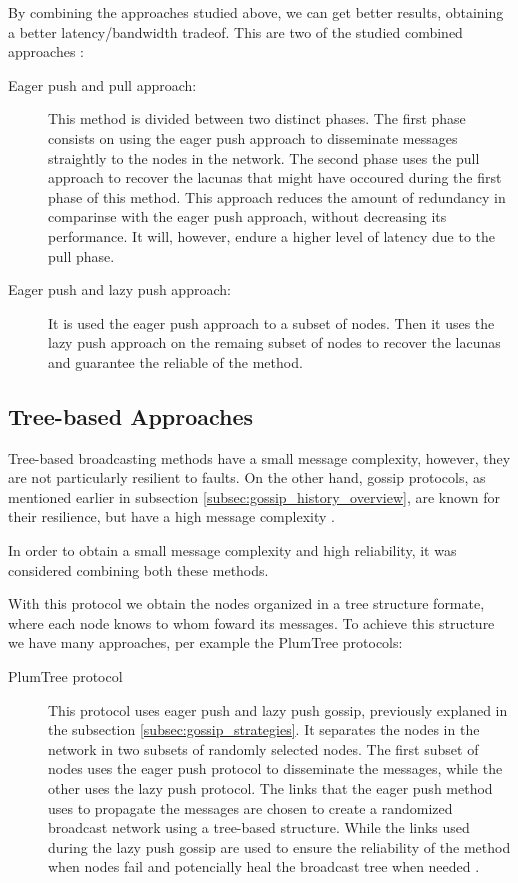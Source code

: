 By combining the approaches studied above, we can get better results, obtaining a better
latency/bandwidth tradeof. This are two of the studied combined approaches \cite{Carvalho2007}:
\begin{description}
    \item[Eager push and pull approach:] This method is divided between two distinct phases.
        The first phase consists on using the eager push approach to disseminate messages
        straightly to the nodes in the network. The second phase uses the pull approach to
        recover the lacunas that might have occoured during the first phase of this method.
        This approach reduces the amount of redundancy in comparinse with the eager push
        approach, without decreasing its performance. It will, however, endure a higher level
        of latency due to the pull phase.
    \item[Eager push and lazy push approach:] It is used the eager push approach to a subset of
        nodes. Then it uses the lazy push approach on the remaing subset of nodes to recover
        the lacunas and guarantee the reliable of the method.
\end{description}


\subsection{Tree-based Approaches}
\label{subsec:gossip_tree_based_approaches}
Tree-based broadcasting methods have a small message complexity, however, they are not
particularly resilient to faults. On the other hand, gossip protocols, as mentioned earlier
in subsection \ref{subsec:gossip_history_overview}, are known for their resilience, but have a
high message complexity \cite{Leitao2007Tree}.

In order to obtain a small message complexity and high reliability, it was considered
combining both these methods.

With this protocol we obtain the nodes organized in a tree structure formate, where each node
knows to whom foward its messages. To achieve this structure we have many approaches,
per example the PlumTree protocols:
\begin{description}
    \item[PlumTree protocol] This protocol uses eager push and lazy push gossip, previously
        explaned in the subsection \ref{subsec:gossip_strategies}. It separates the nodes in the
        network in two subsets of randomly selected nodes. The first subset of nodes uses the
        eager push protocol to disseminate the messages, while the other uses the lazy push
        protocol. The links that the eager push method uses to propagate the messages are
        chosen to create a randomized broadcast network using a tree-based structure. While
        the links used during the lazy push gossip are used to ensure the reliability of the
        method when nodes fail and potencially heal the broadcast tree when needed \cite{Leitao2007Tree}.
\end{description}

